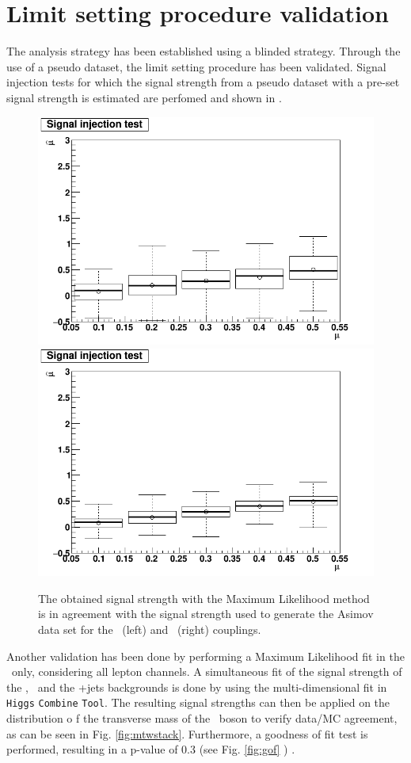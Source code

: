 \section{Limit setting procedure validation}
The analysis strategy has been established using a blinded strategy. Through the use of a pseudo dataset, the limit setting procedure has been validated. Signal injection tests for which the signal strength from a pseudo dataset with a pre-set  signal strength is estimated are perfomed and shown in .
\begin{figure}[ht]
	\centering
	 \includegraphics[width=0.49\linewidth]{6_Search/Figures/SignalInjection/plotZut}
	 \includegraphics[width=0.49\linewidth]{6_Search/Figures/SignalInjection/plotZct}
	\caption{The  obtained signal strength with the Maximum Likelihood method is in agreement with the signal strength used to generate the Asimov data set for the \Zut\ (left) and \Zct\ (right) couplings.}
	\label{fig:plotzut}
\end{figure}

Another validation has been done by performing a Maximum Likelihood fit in the \WZCR\ only, considering all lepton channels. A simultaneous fit of the signal strength of the \NPE, \NPM\ and the \WZ+jets backgrounds is done by using the multi-dimensional fit in \texttt{Higgs} \texttt{Combine} \texttt{Tool}. The resulting signal strengths can then be applied on the distribution o f the transverse mass of the \PW\ boson to verify data/MC agreement, as can be seen in Fig. \ref{fig:mtwstack}. Furthermore, a goodness of fit test is performed, resulting in a p-value of 0.3 (see Fig. \ref{fig:gof} ) .


